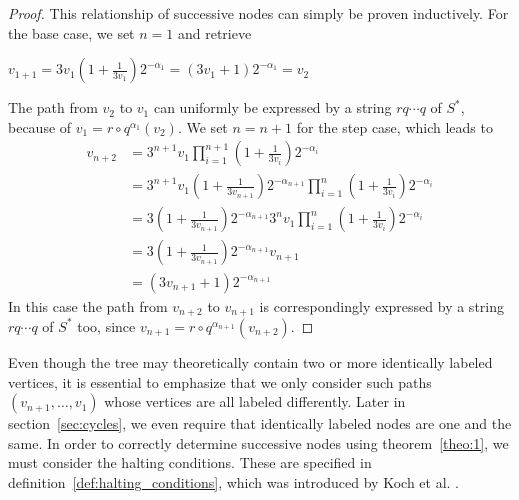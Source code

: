 \begin{proof}
	\label{proof:1}
	This relationship of successive nodes can simply be proven inductively. For the base case, we set $n=1$ and retrieve
	\begin{center}
		$v_{1+1}=3v_1\left(1+\frac{1}{3v_1}\right)2^{-\alpha_1}
		=\left(3v_1+1\right)2^{-\alpha_1}=v_2$
	\end{center}
	The path from $v_2$ to $v_1$ can uniformly be expressed by a string $rq\cdots q$ of $S^\ast$, because of $v_1=r\circ q^{\alpha_1}\left(v_2\right)$. We set $n=n+1$ for the step case, which leads to
	\begin{equation*}
	\begin{array}{cl}
	v_{n+2} &
	=3^{n+1}v_1\prod_{i=1}^{n+1}\left(1+\frac{1}{3v_i}\right)2^{-\alpha_i}\\
	&
	=3^{n+1}v_1\left(1+\frac{1}{3v_{n+1}}\right)2^{-\alpha_{n+1}}\prod_{i=1}^{n}\left(1+\frac{1}{3v_i}\right)2^{-\alpha_i}\\
	&
	=3\left(1+\frac{1}{3v_{n+1}}\right)2^{-\alpha_{n+1}}3^nv_1\prod_{i=1}^{n}\left(1+\frac{1}{3v_i}\right)2^{-\alpha_i}\\
	&
	=3\left(1+\frac{1}{3v_{n+1}}\right)2^{-\alpha_{n+1}}v_{n+1}\\
	&
	=\left(3v_{n+1}+1\right)2^{-\alpha_{n+1}}
	\end{array}
	\end{equation*}
	In this case the path from $v_{n+2}$ to $v_{n+1}$ is correspondingly 
	expressed by a string $rq\cdots q$ of $S^\ast$ too, since
	$v_{n+1}=r\circ q^{\alpha_{n+1}}\left(v_{n+2}\right)$.
\end{proof}

Even though the tree may theoretically contain two or more identically labeled vertices, it is essential to emphasize that we only consider such paths $(v_{n+1},\ldots,v_1)$ whose vertices are all labeled differently. Later in section~\ref{sec:cycles}, we even require that identically labeled nodes are one and the same. In order to correctly determine successive nodes using theorem~\ref{theo:1}, we must consider the halting conditions. These are specified in definition~\ref{def:halting_conditions}, which was introduced by Koch et al. \cite{Ref_Koch_2020}.

